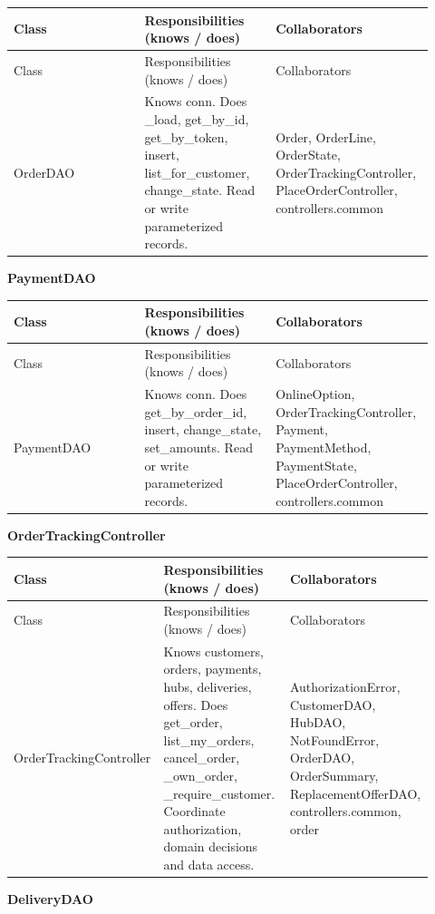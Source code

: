 \begin{longtable}{>{\raggedright\arraybackslash}p{0.3067\linewidth}>{\raggedright\arraybackslash}p{0.3067\linewidth}>{\raggedright\arraybackslash}p{0.3067\linewidth}}
Class & Responsibilities (knows / does) & Collaborators \\
\hline\endfirsthead
Class & Responsibilities (knows / does) & Collaborators \\
\hline\endhead
OrderDAO & Knows conn. Does \_load, get\_by\_id, get\_by\_token, insert, list\_for\_customer, change\_state. Read or write parameterized records. & Order, OrderLine, OrderState, OrderTrackingController, PlaceOrderController, controllers.common \\
\end{longtable}
\textbf{PaymentDAO}

\begin{longtable}{>{\raggedright\arraybackslash}p{0.3067\linewidth}>{\raggedright\arraybackslash}p{0.3067\linewidth}>{\raggedright\arraybackslash}p{0.3067\linewidth}}
Class & Responsibilities (knows / does) & Collaborators \\
\hline\endfirsthead
Class & Responsibilities (knows / does) & Collaborators \\
\hline\endhead
PaymentDAO & Knows conn. Does get\_by\_order\_id, insert, change\_state, set\_amounts. Read or write parameterized records. & OnlineOption, OrderTrackingController, Payment, PaymentMethod, PaymentState, PlaceOrderController, controllers.common \\
\end{longtable}
\textbf{OrderTrackingController}

\begin{longtable}{>{\raggedright\arraybackslash}p{0.3067\linewidth}>{\raggedright\arraybackslash}p{0.3067\linewidth}>{\raggedright\arraybackslash}p{0.3067\linewidth}}
Class & Responsibilities (knows / does) & Collaborators \\
\hline\endfirsthead
Class & Responsibilities (knows / does) & Collaborators \\
\hline\endhead
OrderTrackingController & Knows customers, orders, payments, hubs, deliveries, offers. Does get\_order, list\_my\_orders, cancel\_order, \_own\_order, \_require\_customer. Coordinate authorization, domain decisions and data access. & AuthorizationError, CustomerDAO, HubDAO, NotFoundError, OrderDAO, OrderSummary, ReplacementOfferDAO, controllers.common, order \\
\end{longtable}
\textbf{DeliveryDAO}

